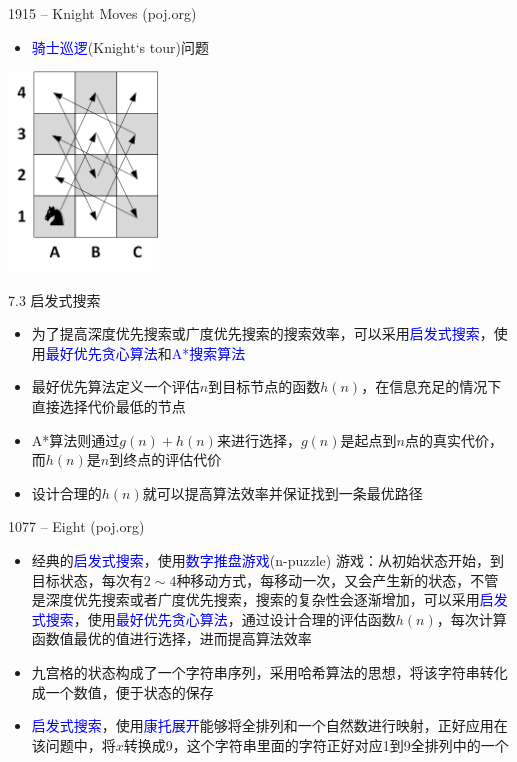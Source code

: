 \begin{frame}{1915 -- Knight Moves (poj.org)}
    \begin{itemize}
        \item \textcolor{blue}{骑士巡逻}(Knight‘s tour)问题
    \end{itemize}
    \vfill
    \includegraphics[width=0.3\textwidth,center]{fig/7-3.png}
\end{frame}
\begin{frame}{7.3 启发式搜索}
    \begin{itemize}
        \item 为了提高深度优先搜索或广度优先搜索的搜索效率，可以采用\textcolor{blue}{启发式搜索}，使用\textcolor{blue}{最好优先贪心算法}和\textcolor{blue}{A*搜索算法}
        \item 最好优先算法定义一个评估$n$到目标节点的函数$h(n)$，在信息充足的情况下直接选择代价最低的节点
        \item A*算法则通过$g(n)+h(n)$来进行选择，$g(n)$是起点到$n$点的真实代价，而$h(n)$是$n$到终点的评估代价
        \item 设计合理的$h(n)$就可以提高算法效率并保证找到一条最优路径
    \end{itemize}
\end{frame}
\begin{frame}{1077 -- Eight (poj.org)}
    \begin{itemize}
        \item 经典的\textcolor{blue}{启发式搜索}，使用\textcolor{blue}{数字推盘游戏}(n-puzzle) 游戏：从初始状态开始，到目标状态，每次有$2\sim4$种移动方式，每移动一次，又会产生新的状态，不管是深度优先搜索或者广度优先搜索，搜索的复杂性会逐渐增加，可以采用\textcolor{blue}{启发式搜索}，使用\textcolor{blue}{最好优先贪心算法}，通过设计合理的评估函数$h(n)$，每次计算函数值最优的值进行选择，进而提高算法效率
        \item 九宫格的状态构成了一个字符串序列，采用哈希算法的思想，将该字符串转化成一个数值，便于状态的保存
        \item \textcolor{blue}{启发式搜索}，使用\textcolor{blue}{康托展开}能够将全排列和一个自然数进行映射，正好应用在该问题中，将$x$转换成9，这个字符串里面的字符正好对应1到9全排列中的一个
    \end{itemize}
\end{frame}
